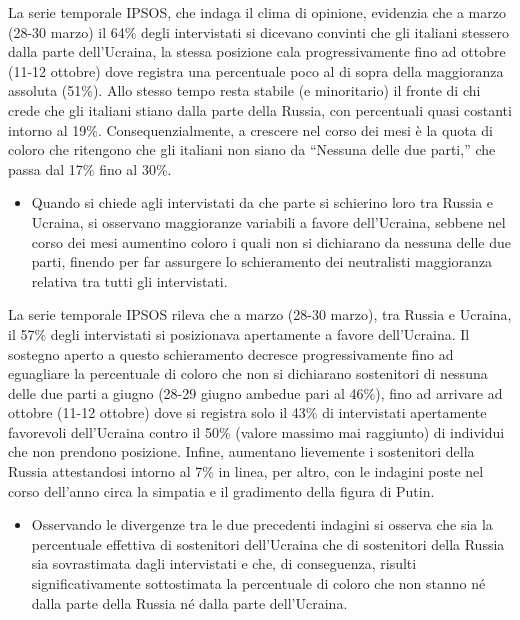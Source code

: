 \documentclass[
]{book}
\providecommand{\tightlist}{%
  \setlength{\itemsep}{0pt}\setlength{\parskip}{0pt}}
\begin{document}
La serie temporale IPSOS, che indaga il clima di opinione, evidenzia che a marzo (28-30 marzo) il 64\% degli intervistati si dicevano convinti che gli italiani stessero dalla parte dell'Ucraina, la stessa posizione cala progressivamente fino ad ottobre (11-12 ottobre) dove registra una percentuale poco al di sopra della maggioranza assoluta (51\%). Allo stesso tempo resta stabile (e minoritario) il fronte di chi crede che gli italiani stiano dalla parte della Russia, con percentuali quasi costanti intorno al 19\%. Consequenzialmente, a crescere nel corso dei mesi è la quota di coloro che ritengono che gli italiani non siano da ``Nessuna delle due parti,'' che passa dal 17\% fino al 30\%.

\begin{itemize}
\tightlist
\item
  Quando si chiede agli intervistati da che parte si schierino loro tra Russia e Ucraina, si osservano maggioranze variabili a favore dell'Ucraina, sebbene nel corso dei mesi aumentino coloro i quali non si dichiarano da nessuna delle due parti, finendo per far assurgere lo schieramento dei neutralisti maggioranza relativa tra tutti gli intervistati.
\end{itemize}

La serie temporale IPSOS rileva che a marzo (28-30 marzo), tra Russia e Ucraina, il 57\% degli intervistati si posizionava apertamente a favore dell'Ucraina. Il sostegno aperto a questo schieramento decresce progressivamente fino ad eguagliare la percentuale di coloro che non si dichiarano sostenitori di nessuna delle due parti a giugno (28-29 giugno ambedue pari al 46\%), fino ad arrivare ad ottobre (11-12 ottobre) dove si registra solo il 43\% di intervistati apertamente favorevoli dell'Ucraina contro il 50\% (valore massimo mai raggiunto) di individui che non prendono posizione. Infine, aumentano lievemente i sostenitori della Russia attestandosi intorno al 7\% in linea, per altro, con le indagini poste nel corso dell'anno circa la simpatia e il gradimento della figura di Putin.

\begin{itemize}
\tightlist
\item
  Osservando le divergenze tra le due precedenti indagini si osserva che sia la percentuale effettiva di sostenitori dell'Ucraina che di sostenitori della Russia sia sovrastimata dagli intervistati e che, di conseguenza, risulti significativamente sottostimata la percentuale di coloro che non stanno né dalla parte della Russia né dalla parte dell'Ucraina.
\end{itemize}
\end{document}
